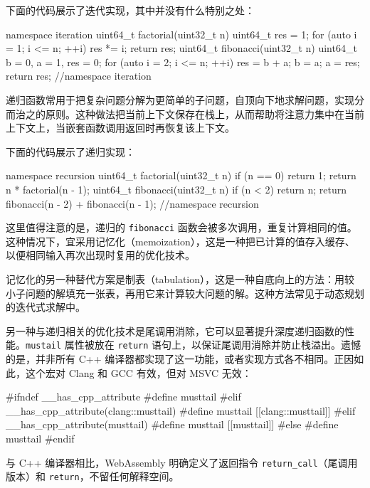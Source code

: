 下面的代码展示了迭代实现，其中并没有什么特别之处：

\begin{codebox}[cpp]
namespace iteration {
uint64_t factorial(uint32_t n) {
  uint64_t res = 1;
  for (auto i = 1; i <= n; ++i) {
    res *= i;
  }
  return res;
}
uint64_t fibonacci(uint32_t n) {
  uint64_t b = 0, a = 1, res = 0;
  for (auto i = 2; i <= n; ++i) {
    res = b + a;
    b = a;
    a = res;
  }
  return res;
}
} //namespace iteration
\end{codebox}

递归函数常用于把复杂问题分解为更简单的子问题，自顶向下地求解问题，实现分而治之的原则。这种做法把当前上下文保存在栈上，从而帮助将注意力集中在当前上下文上，当嵌套函数调用返回时再恢复该上下文。

下面的代码展示了递归实现：

\begin{codebox}[cpp]
namespace recursion {
uint64_t factorial(uint32_t n) {
  if (n == 0) {
    return 1;
  }
  return n * factorial(n - 1);
}
uint64_t fibonacci(uint32_t n) {
  if (n < 2) {
    return n;
  }
  return fibonacci(n - 2) + fibonacci(n - 1);
}
} //namespace recursion
\end{codebox}

这里值得注意的是，递归的 \texttt{fibonacci} 函数会被多次调用，重复计算相同的值。这种情况下，宜采用记忆化（memoization），这是一种把已计算的值存入缓存、以便相同输入再次出现时复用的优化技术。

\label{idx:1295}
记忆化的另一种替代方案是制表（tabulation），这是一种自底向上的方法：用较小子问题的解填充一张表，再用它来计算较大问题的解。这种方法常见于动态规划的迭代式求解中。

另一种与递归相关的优化技术是尾调用消除，它可以显著提升深度递归函数的性能。\texttt{mustail} 属性被放在 \texttt{return} 语句上，以保证尾调用消除并防止栈溢出。遗憾的是，并非所有 C++ 编译器都实现了这一功能，或者实现方式各不相同。正因如此，这个宏对 Clang 和 GCC 有效，但对 MSVC 无效：

\begin{codebox}[text]
#ifndef __has_cpp_attribute
#define musttail
#elif __has_cpp_attribute(clang::musttail)
#define musttail [[clang::musttail]]
#elif __has_cpp_attribute(musttail)
#define musttail [[musttail]]
#else
#define musttail
#endif
\end{codebox}

与 C++ 编译器相比，WebAssembly 明确定义了返回指令 \texttt{return\_\allowbreak{}call}（尾调用版本）和 \texttt{return}，不留任何解释空间。

